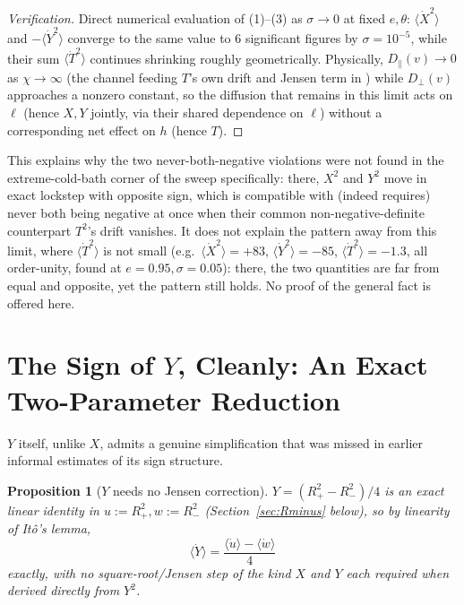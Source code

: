 \documentclass[12pt]{amsart}
\theoremstyle{plain}
\newtheorem{proposition}[theorem]{Proposition}
\theoremstyle{remark}
\begin{document}
\begin{proof}[Verification]
Direct numerical evaluation of (1)--(3) as $\sigma\to0$ at fixed $e,\theta$: $\langle\dot X^2\rangle$ and $-\langle\dot Y^2\rangle$ converge to the same value to $6$ significant figures by $\sigma=10^{-5}$, while their sum $\langle\dot T^2\rangle$ continues shrinking roughly geometrically. Physically, $D_\parallel(v)\to0$ as $\chi\to\infty$ (the channel feeding $T$'s own drift and Jensen term in \cite{Ebert2026Cancellation}) while $D_\perp(v)$ approaches a nonzero constant, so the diffusion that remains in this limit acts on $\ell$ (hence $X,Y$ jointly, via their shared dependence on $\ell$) without a corresponding net effect on $h$ (hence $T$).
\end{proof}

This explains why the two never-both-negative violations were not found in the extreme-cold-bath corner of the sweep specifically: there, $X^2$ and $Y^2$ move in exact lockstep with opposite sign, which is compatible with (indeed requires) never both being negative at once when their common non-negative-definite counterpart $T^2$'s drift vanishes. It does not explain the pattern away from this limit, where $\langle\dot T^2\rangle$ is not small (e.g.\ $\langle\dot X^2\rangle=+83$, $\langle\dot Y^2\rangle=-85$, $\langle\dot T^2\rangle=-1.3$, all order-unity, found at $e=0.95,\sigma=0.05$): there, the two quantities are far from equal and opposite, yet the pattern still holds. No proof of the general fact is offered here.

\section{The Sign of $Y$, Cleanly: An Exact Two-Parameter Reduction}\label{sec:Yclean}

$Y$ itself, unlike $X$, admits a genuine simplification that was missed in earlier informal estimates of its sign structure.

\begin{proposition}[$Y$ needs no Jensen correction]\label{prop:Ylinear}
$Y=(R_+^2-R_-^2)/4$ is an exact linear identity in $u:=R_+^2,w:=R_-^2$ (Section~\ref{sec:Rminus} below), so by linearity of It\^o's lemma,
\begin{equation}
\langle\dot Y\rangle = \frac{\langle\dot u\rangle-\langle\dot w\rangle}{4} \tag{4$'$}
\end{equation}
exactly, with no square-root/Jensen step of the kind $X$ and $Y$ each required when derived directly from $Y^2$.
\end{proposition}
\end{document}
